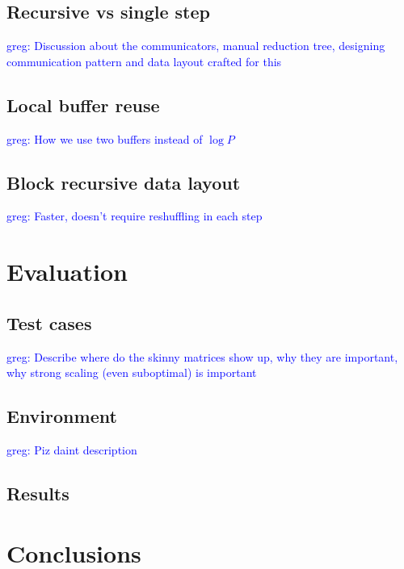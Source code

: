 \documentclass[sigconf]{acmart}
\newcommand\greg[1]{\textcolor{blue}{greg: #1}}
\begin{document}
\subsection{Recursive vs single step}
\greg{Discussion about the communicators, manual reduction tree, designing 
communication pattern and data layout crafted for this}
\subsection{Local buffer reuse}
\greg{How we use two buffers instead of $\log P$}
\subsection{Block recursive data layout}
\greg{Faster, doesn't require reshuffling in each step}

\section{Evaluation}
\subsection{Test cases}
\greg{Describe where do the skinny matrices show up, why they are important, 
why strong scaling (even suboptimal) is important}
\subsection{Environment}
\greg{Piz daint description}
\subsection{Results}

\section{Conclusions}

%



\end{document}
